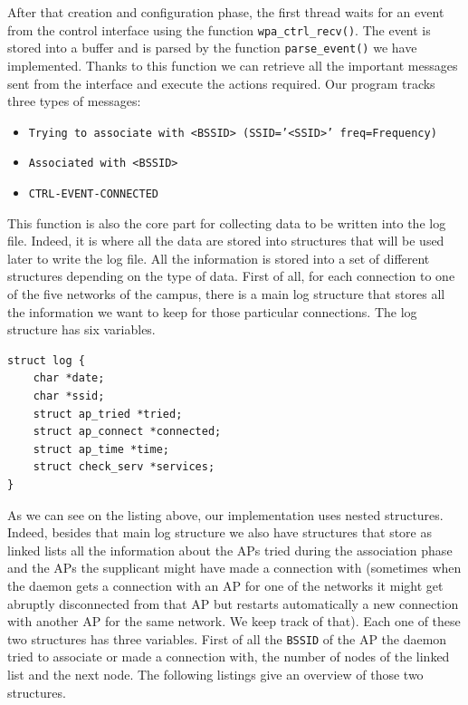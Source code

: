 After that creation and configuration phase, the first thread waits for an event from the control interface using the function \texttt{wpa\_ctrl\_recv()}. The event is stored into a buffer and is parsed by the function \texttt{parse\_event()} we have implemented. Thanks to this function we can retrieve all the important messages sent from the interface and execute the actions required. Our program tracks three types of messages:
\begin{itemize}
	\item \texttt{Trying to associate with <BSSID> (SSID='<SSID>' freq=Frequency)}
	\item \texttt{Associated with <BSSID>}
	\item \texttt{CTRL-EVENT-CONNECTED}
\end{itemize}

This function is also the core part for collecting data to be written into the log file. Indeed, it is where all the data are stored into structures that will be used later to write the log file. All the information is stored into a set of different structures depending on the type of data. First of all, for each connection to one of the five networks of the campus, there is a main log structure that stores all the information we want to keep for those particular connections. The log structure has six variables.\\

\begin{lstlisting}[frame=single,breaklines=true,caption={Log structure}]
struct log {
	char *date;
	char *ssid;
	struct ap_tried *tried;
	struct ap_connect *connected;
	struct ap_time *time;
	struct check_serv *services;
}
\end{lstlisting}

As we can see on the listing above, our implementation uses nested structures. Indeed, besides that main log structure we also have structures that store as linked lists all the information about the APs tried during the association phase and the APs the supplicant might have made a connection with (sometimes when the daemon gets a connection with an AP for one of the networks it might get abruptly disconnected from that AP but restarts automatically a new connection with another AP for the same network. We keep track of that). Each one of these two structures has three variables. First of all the \texttt{BSSID} of the AP the daemon tried to associate or made a connection with, the number of nodes of the linked list and the next node. The following listings give an overview of those two structures.\\


